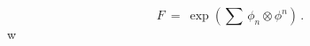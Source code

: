 \begin{equation} F \ = \ \exp\left(\sum\,\phi_n\otimes
\phi^n\right)\, .\label{r353}\end{equation}w
